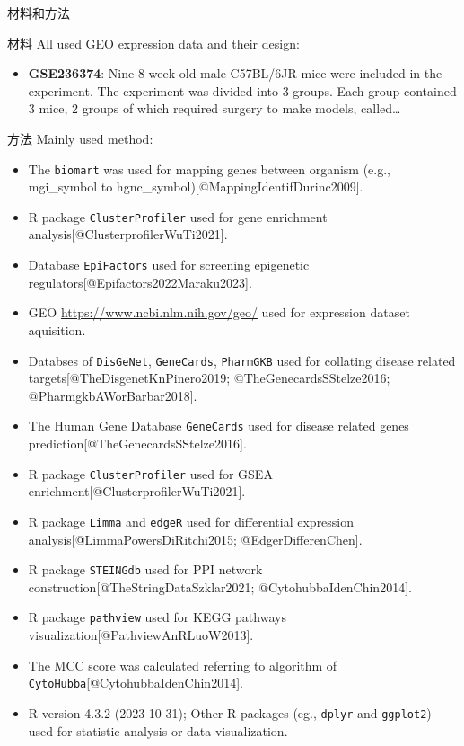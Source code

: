 \documentclass[
  ignorenonframetext,
]{beamer}
\providecommand{\tightlist}{%
  \setlength{\itemsep}{0pt}\setlength{\parskip}{0pt}}
\begin{document}
\begin{frame}[fragile]{材料和方法}
\protect\hypertarget{methods}{}
\begin{block}{材料}
\protect\hypertarget{ux6750ux6599}{}
All used GEO expression data and their design:

\begin{itemize}
\tightlist
\item
  \textbf{GSE236374}: Nine 8-week-old male C57BL/6JR mice were included
  in the experiment. The experiment was divided into 3 groups. Each
  group contained 3 mice, 2 groups of which required surgery to make
  models, called\ldots{}
\end{itemize}
\end{block}

\begin{block}{方法}
\protect\hypertarget{ux65b9ux6cd5}{}
Mainly used method:

\begin{itemize}
\tightlist
\item
  The \texttt{biomart} was used for mapping genes between organism
  (e.g., mgi\_symbol to hgnc\_symbol){[}@MappingIdentifDurinc2009{]}.
\item
  R package \texttt{ClusterProfiler} used for gene enrichment
  analysis{[}@ClusterprofilerWuTi2021{]}.
\item
  Database \texttt{EpiFactors} used for screening epigenetic
  regulators{[}@Epifactors2022Maraku2023{]}.
\item
  GEO \url{https://www.ncbi.nlm.nih.gov/geo/} used for expression
  dataset aquisition.
\item
  Databses of \texttt{DisGeNet}, \texttt{GeneCards}, \texttt{PharmGKB}
  used for collating disease related targets{[}@TheDisgenetKnPinero2019;
  @TheGenecardsSStelze2016; @PharmgkbAWorBarbar2018{]}.
\item
  The Human Gene Database \texttt{GeneCards} used for disease related
  genes prediction{[}@TheGenecardsSStelze2016{]}.
\item
  R package \texttt{ClusterProfiler} used for GSEA
  enrichment{[}@ClusterprofilerWuTi2021{]}.
\item
  R package \texttt{Limma} and \texttt{edgeR} used for differential
  expression analysis{[}@LimmaPowersDiRitchi2015; @EdgerDifferenChen{]}.
\item
  R package \texttt{STEINGdb} used for PPI network
  construction{[}@TheStringDataSzklar2021; @CytohubbaIdenChin2014{]}.
\item
  R package \texttt{pathview} used for KEGG pathways
  visualization{[}@PathviewAnRLuoW2013{]}.
\item
  The MCC score was calculated referring to algorithm of
  \texttt{CytoHubba}{[}@CytohubbaIdenChin2014{]}.
\item
  R version 4.3.2 (2023-10-31); Other R packages (eg., \texttt{dplyr}
  and \texttt{ggplot2}) used for statistic analysis or data
  visualization.
\end{itemize}
\end{block}
\end{frame}
\end{document}
